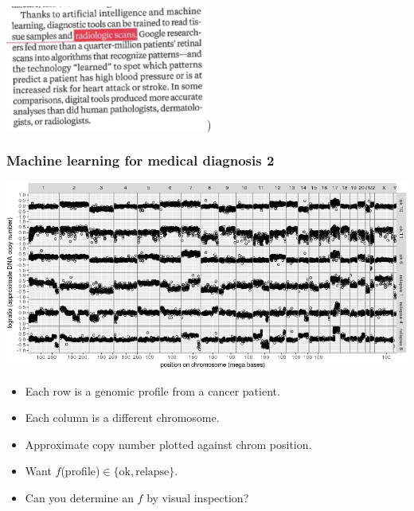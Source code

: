 \documentclass{beamer}
\begin{document}
\begin{frame}
{\includegraphics[width=0.5\textwidth]{retinal-scans/national-geographic-medicine-paragraph})
}

\end{frame}

\begin{frame}
  \frametitle{Machine learning for medical diagnosis 2}

\includegraphics[width=\textwidth]{neuroblastoma-ok-relapse}

\begin{itemize}
\item Each row is a genomic profile from a cancer patient.
\item Each column is a different chromosome.
\item Approximate copy number plotted against chrom position.
\item Want $f$(profile)$\in\{\text{ok},\text{relapse}\}$.
\item Can you determine an $f$ by visual inspection?
\end{itemize}

\end{frame}
\end{document}
